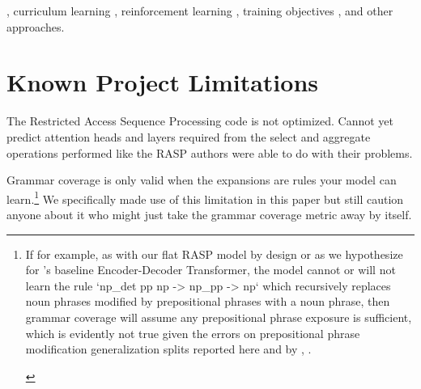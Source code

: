 \documentclass[11pt]{article}
\begin{document}
{\begin{footnotesize}
\end{footnotesize}}, curriculum learning \cite{10.1145/1553374.1553380}, reinforcement learning \cite{Ranzato2015}, training objectives \cite{10.1162/tacl_a_00733}, and other approaches.

\clearpage
\section*{Known Project Limitations}

The Restricted Access Sequence Processing code is not optimized. Cannot yet predict attention heads and layers required from the select and aggregate operations performed like the RASP authors \cite{Weiss2021} were able to do with their problems.

Grammar coverage \cite{fuzzingbook2023:GrammarCoverageFuzzer} is only valid when the expansions are rules your model can learn.\footnote{\begin{footnotesize}If for example, as with our flat RASP model by design or as we hypothesize for \cite{Wu2023}'s baseline Encoder-Decoder Transformer, the model cannot or will not learn the rule `np\_det pp np -> np\_pp -> np` which recursively replaces noun phrases modified by prepositional phrases with a noun phrase, then grammar coverage will assume any prepositional phrase exposure is sufficient, which is evidently not true given the errors on prepositional phrase modification generalization splits reported here and by \cite{Wu2023}, \cite{KimLinzen2020}.
\end{footnotesize}
} We specifically made use of this limitation in this paper but still caution anyone about it who might just take the grammar coverage metric away by itself.
\end{document}
